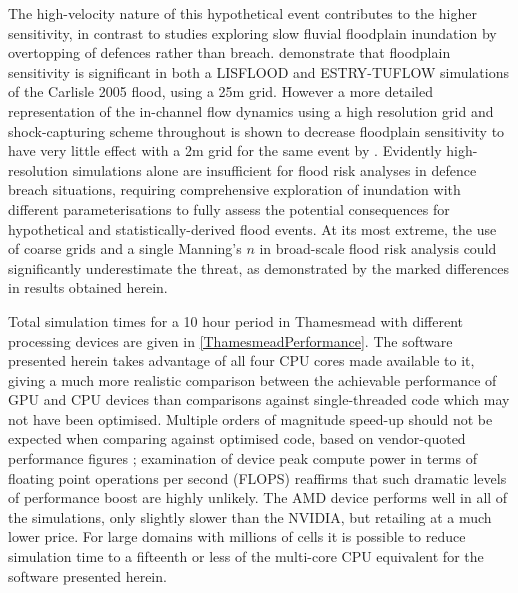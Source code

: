 \documentclass[11pt,english,a4paper]{article}
\begin{document}
The high-velocity nature of this hypothetical event contributes to the higher sensitivity, in contrast to studies exploring slow fluvial floodplain inundation by overtopping of defences rather than breach. \citet{Fewtrell2011a} demonstrate that floodplain sensitivity is significant in both a LISFLOOD and ESTRY-TUFLOW simulations of the Carlisle 2005 flood, using a 25m grid. However a more detailed representation of the in-channel flow dynamics using a high resolution grid and shock-capturing scheme throughout is shown to decrease floodplain sensitivity to have very little effect with a 2m grid for the same event by \citet{Smith2015}.  Evidently high-resolution simulations alone are insufficient for flood risk analyses in defence breach situations, requiring comprehensive exploration of inundation with different parameterisations to fully assess the potential consequences for hypothetical and statistically-derived flood events. At its most extreme, the use of coarse grids and a single Manning's $n$ in broad-scale flood risk analysis could significantly underestimate the threat, as demonstrated by the marked differences in results obtained herein.

Total simulation times for a 10 hour period in Thamesmead with different processing devices are given in \ref{ThamesmeadPerformance}. The software presented herein takes advantage of all four CPU cores made available to it, giving a much more realistic comparison between the achievable performance of GPU and CPU devices than comparisons against single-threaded code which may not have been optimised. Multiple orders of magnitude speed-up should not be expected when comparing against optimised code, based on vendor-quoted performance figures \citep{Brodtkorb2012,Smith2013}; examination of device peak compute power in terms of floating point operations per second (FLOPS) reaffirms that such dramatic levels of performance boost are highly unlikely. The AMD device performs well in all of the simulations, only slightly slower than the NVIDIA, but retailing at a much lower price. For large domains with millions of cells it is possible to reduce simulation time to a fifteenth or less of the multi-core CPU equivalent for the software presented herein.
\end{document}
